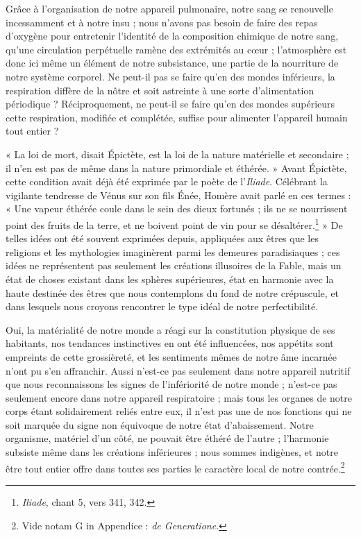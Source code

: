 \documentclass[a4paper, 11pt, oneside]{article}
\begin{document}
Grâce à l'organisation de notre appareil pulmonaire, notre sang se renouvelle incessamment et à notre insu ; nous n'avons pas besoin de faire des repas d'oxygène pour entretenir l'identité de la composition chimique de notre sang, qu'une circulation perpétuelle ramène des extrémités au cœur ; l'atmosphère est donc ici même un élément de notre subsistance, une partie de la nourriture de notre système corporel. Ne peut-il pas se faire qu'en des mondes inférieurs, la respiration diffère de la nôtre et soit astreinte à une sorte d'alimentation périodique ? Réciproquement, ne peut-il se faire qu'en des mondes supérieurs cette respiration, modifiée et complétée, suffise pour alimenter l'appareil humain tout entier ?

« La loi de mort, disait Épictète, est la loi de la nature matérielle et secondaire ; il n'en est pas de même dans la nature primordiale et éthérée. » Avant Épictète, cette condition avait déjà été exprimée par le poète de l'\emph{Iliade}. Célébrant la vigilante tendresse de Vénus sur son fils Énée, Homère avait parlé en ces termes : « Une vapeur éthérée coule dans le sein des dieux fortunés ; ils ne se nourrissent point des fruits de la terre, et ne boivent point de vin pour se désaltérer.\footnote{\emph{Iliade}, chant 5, vers 341, 342.} » De telles idées ont été souvent exprimées depuis, appliquées aux êtres que les religions et les mythologies imaginèrent parmi les demeures paradisiaques ; ces idées ne représentent pas seulement les créations illusoires de la Fable, mais un état de choses existant dans les sphères supérieures, état en harmonie avec la haute destinée des êtres que nous contemplons du fond de notre crépuscule, et dans lesquels nous croyons rencontrer le type idéal de notre perfectibilité.

Oui, la matérialité de notre monde a réagi sur la constitution physique de ses habitants, nos tendances instinctives en ont été influencées, nos appétits sont empreints de cette grossièreté, et les sentiments mêmes de notre âme incarnée n'ont pu s'en affranchir. Aussi n'est-ce pas seulement dans notre appareil nutritif que nous reconnaissons les signes de l'infériorité de notre monde ; n'est-ce pas seulement encore dans notre appareil respiratoire ; mais tous les organes de notre corps étant solidairement reliés entre eux, il n'est pas une de nos fonctions qui ne soit marquée du signe non équivoque de notre état d'abaissement. Notre organisme, matériel d'un côté, ne pouvait être éthéré de l'autre ; l'harmonie subsiste même dans les créations inférieures ; nous sommes indigènes, et notre être tout entier offre dans toutes ses parties le caractère local de notre contrée.\footnote{Vide notam G in Appendice : \emph{de Generatione}.}
\end{document}
